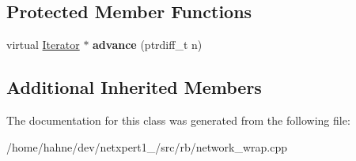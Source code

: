 \subsection*{Protected Member Functions}
\begin{DoxyCompactItemize}
\item 
virtual \hyperlink{structswig_1_1Iterator}{Iterator} $\ast$ {\bfseries advance} (ptrdiff\+\_\+t n)\hypertarget{classswig_1_1IteratorClosed__T_3_01InOutIterator_00_01bool_00_01FromOper_00_01AsvalOper_01_4_a3ba465f17ab1dc0cdc9c8dcc89279cd0}{}\label{classswig_1_1IteratorClosed__T_3_01InOutIterator_00_01bool_00_01FromOper_00_01AsvalOper_01_4_a3ba465f17ab1dc0cdc9c8dcc89279cd0}

\end{DoxyCompactItemize}
\subsection*{Additional Inherited Members}


The documentation for this class was generated from the following file\+:\begin{DoxyCompactItemize}
\item 
/home/hahne/dev/netxpert1\+\_/src/rb/network\+\_\+wrap.\+cpp\end{DoxyCompactItemize}
